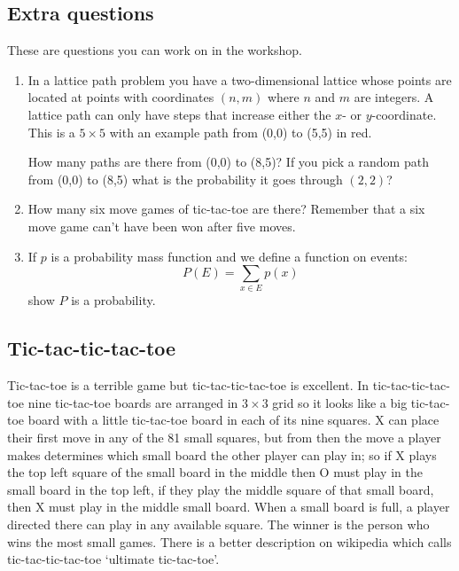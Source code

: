 \documentclass[11pt,a4paper]{scrartcl}
\begin{document}
\subsection*{Extra questions}

These are questions you can work on in the workshop.

\begin{enumerate}

\item In a lattice path problem you have a two-dimensional lattice
  whose points are located at points with coordinates $(n,m)$ where
  $n$ and $m$ are integers. A lattice path can only have steps that
  increase either the $x$- or $y$-coordinate. This is a $5\times5$ with an example path from (0,0) to (5,5) in red.
\begin{center}
\end{center}
How many paths are there from (0,0) to (8,5)? If you pick a random path from (0,0) to (8,5) what is the probability it goes through $(2,2)$?

\item How many six move games of tic-tac-toe are there? Remember that
  a six move game can't have been won after five moves.

\item If $p$ is a probability mass function and we define a function on events:
  \begin{equation}
    P(E)=\sum_{x\in E}p(x)
  \end{equation}
  show $P$ is a probability.
  
\end{enumerate}

\subsection*{Tic-tac-tic-tac-toe}

Tic-tac-toe is a terrible game but tic-tac-tic-tac-toe is
excellent. In tic-tac-tic-tac-toe nine tic-tac-toe boards are arranged
in $3\times 3$ grid so it looks like a big tic-tac-toe board with a
little tic-tac-toe board in each of its nine squares. X can place
their first move in any of the 81 small squares, but from then the
move a player makes determines which small board the other player can
play in; so if X plays the top left square of the small board in the
middle then O must play in the small board in the top left, if they
play the middle square of that small board, then X must play in the
middle small board. When a small board is full, a player directed
there can play in any available square. The winner is the person who
wins the most small games. There is a better description on wikipedia
which calls tic-tac-tic-tac-toe `ultimate tic-tac-toe'.
\end{document}
